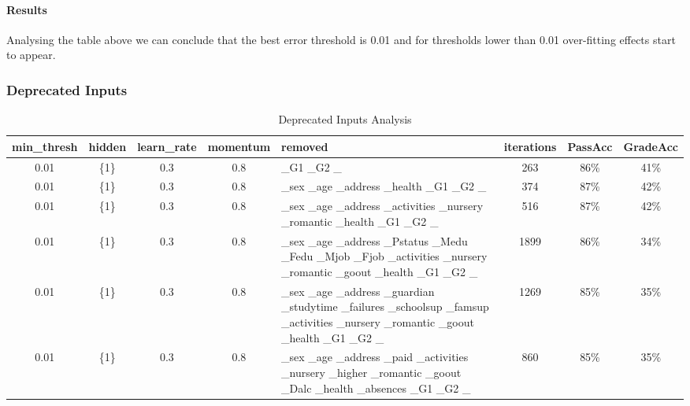 \documentclass[11pt]{article}
\begin{document}
\paragraph{Results}
Analysing the table above we can conclude that the best error threshold is 0.01 and for thresholds lower than 0.01 over-fitting effects start to appear.

\subsubsection{Deprecated Inputs}
\begin{table}[H]
\begin{tabular}{| c | c | c | c | p{3cm} | c | c | c |}
\hline \textbf{min\_thresh} & \textbf{hidden} & \textbf{learn\_rate} & \textbf{momentum} & \textbf{removed} & \textbf{iterations} & \textbf{PassAcc} & \textbf{GradeAcc}\\
\hline 0.01 & \{1\} & 0.3 & 0.8 & \_G1 \_G2 \_ & 263 & 86\% & 41\%\\
\hline 0.01 & \{1\} & 0.3 & 0.8 & \_sex \_age \_address \_health \_G1 \_G2 \_ & 374 & 87\% & 42\%\\
\hline 0.01 & \{1\} & 0.3 & 0.8 & \_sex \_age \_address \_activities \_nursery \_romantic \_health \_G1 \_G2 \_ & 516 & 87\% & 42\%\\
\hline 0.01 & \{1\} & 0.3 & 0.8 & \_sex \_age \_address \_Pstatus \_Medu \_Fedu \_Mjob \_Fjob \_activities \_nursery \_romantic \_goout \_health \_G1 \_G2 \_ & 1899 & 86\% & 34\%\\
\hline 0.01 & \{1\} & 0.3 & 0.8 & \_sex \_age \_address \_guardian \_studytime \_failures \_schoolsup \_famsup \_activities \_nursery \_romantic \_goout \_health \_G1 \_G2 \_ & 1269 & 85\% & 35\%\\
\hline 0.01 & \{1\} & 0.3 & 0.8 & \_sex \_age \_address \_paid \_activities \_nursery \_higher \_romantic \_goout \_Dalc \_health \_absences \_G1 \_G2 \_ & 860 & 85\% & 35\%\\
\hline
\end{tabular}
\caption{Deprecated Inputs Analysis}
\end{table}
\end{document}
